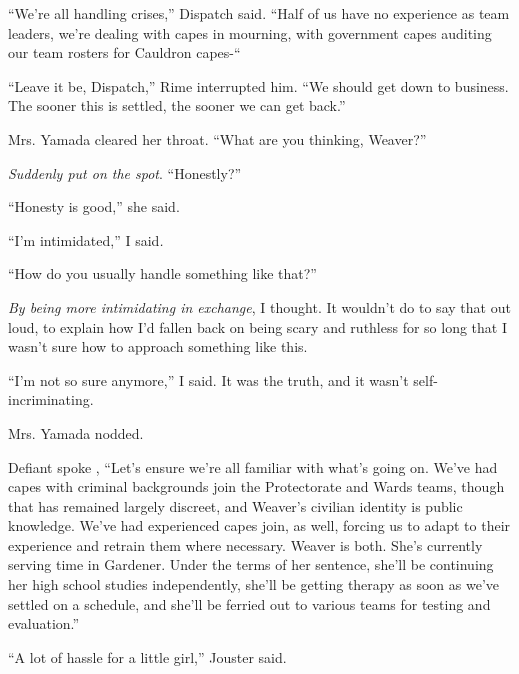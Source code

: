 ``We're all handling crises,'' Dispatch said.  ``Half of us have no experience as team leaders, we're dealing with capes in mourning, with government capes auditing our team rosters for Cauldron capes-``



``Leave it be, Dispatch,'' Rime interrupted him.  ``We should get down to business.  The sooner this is settled, the sooner we can get back.''



Mrs. Yamada cleared her throat.  ``What are you thinking, Weaver?''



\emph{Suddenly put on the spot}.  ``Honestly?''



``Honesty is good,'' she said.



``I'm intimidated,'' I said\emph{.}



``How do you usually handle something like that?''



\emph{By being more intimidating in exchange}, I thought.  It wouldn't do to say that out loud, to explain how I'd fallen back on being scary and ruthless for so long that I wasn't sure how to approach something like this.



``I'm not so sure anymore,'' I said.  It was the truth, and it wasn't self-incriminating.



Mrs. Yamada nodded.



Defiant spoke , ``Let's ensure we're all familiar with what's going on. We've had capes with criminal backgrounds join the Protectorate and Wards teams, though that has remained largely discreet, and Weaver's civilian identity is public knowledge.  We've had experienced capes join, as well, forcing us to adapt to their experience and retrain them where necessary.  Weaver is both.  She's currently serving time in Gardener.  Under the terms of her sentence, she'll be continuing her high school studies independently, she'll be getting therapy as soon as we've settled on a schedule, and she'll be ferried out to various teams for testing and evaluation.''



``A lot of hassle for a little girl,'' Jouster said.



